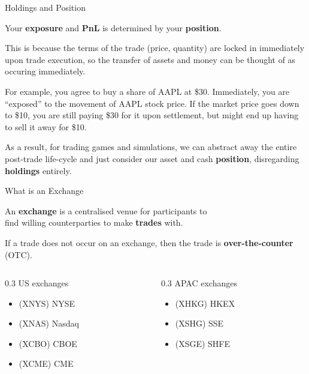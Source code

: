\begin{frame}{Holdings and Position}
  \begin{sqt:result}
    Your \textbf{exposure} and \textbf{PnL} is determined by your \textbf{position}.
  \end{sqt:result}

  This is because the terms of the trade (price, quantity) are locked in immediately upon trade execution,
  so the transfer of assets and money can be thought of as occuring immediately.

  \begin{sqt:tip}
    For example, you agree to buy a share of AAPL at \$30.
    Immediately, you are ``exposed'' to the movement of AAPL stock price.
    If the market price goes down to \$10, you are still paying \$30 for it upon settlement,
    but might end up having to sell it away for \$10.
  \end{sqt:tip}

  As a result, for trading games and simulations, we can abstract away the entire post-trade life-cycle
  and just consider our asset and cash \textbf{position}, disregarding \textbf{holdings} entirely.
\end{frame}

\begin{frame}{What is an Exchange}
  \begin{sqt:definition}
    An \textbf{exchange} is a centralised venue for participants to\\
    find willing counterparties to make \textbf{trades} with.
  \end{sqt:definition}
  \begin{sqt:definition}
    If a trade does not occur on an exchange, then the trade is \textbf{over-the-counter} (OTC).
  \end{sqt:definition}
  \vspace{0.5cm}

  \begin{center}
    \begin{columns}
      \begin{column}[t]{0.3\textwidth}
        US exchanges
        \begin{itemize}
          \item (XNYS) NYSE
          \item (XNAS) Nasdaq
          \item (XCBO) CBOE
          \item (XCME) CME
        \end{itemize}
      \end{column}

      \begin{column}[t]{0.3\textwidth}
        APAC exchanges
        \begin{itemize}
          \item (XHKG) HKEX
          \item (XSHG) SSE
          \item (XSGE) SHFE
        \end{itemize}
      \end{column}
    \end{columns}
  \end{center}
\end{frame}

